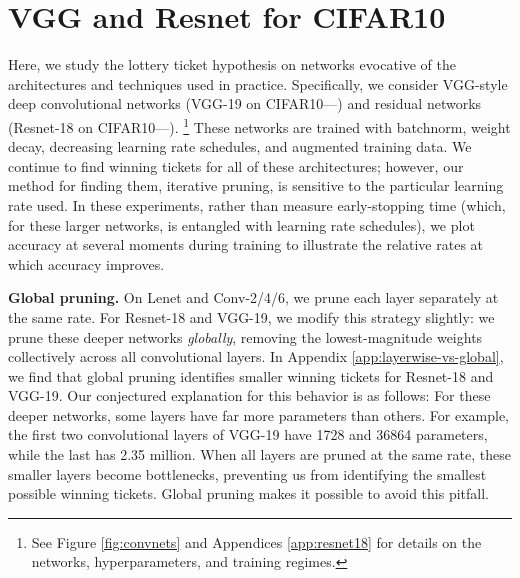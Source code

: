 \section{VGG and Resnet for CIFAR10}
\label{sec:larger}

Here, we study the lottery ticket hypothesis on networks evocative of the architectures and techniques used in practice.
Specifically, we consider VGG-style deep convolutional networks (VGG-19 on CIFAR10---\citet{vgg}) and residual
networks (Resnet-18 on CIFAR10---\citet{resnet}).%
\footnote{See Figure \ref{fig:convnets} and Appendices \ref{app:resnet18} for details on the networks, hyperparameters, and training regimes.}
These networks are trained with batchnorm, weight decay,
decreasing learning rate schedules, and augmented training data.
We continue to find winning tickets for all of these architectures; however, our method for finding them, iterative pruning,
is sensitive to the particular learning rate used. In these experiments, rather than measure early-stopping time (which, for these
larger networks, is entangled with learning rate schedules), we plot accuracy at several moments during training to illustrate
the relative rates at which accuracy improves.

\textbf{Global pruning.}
On Lenet and Conv-2/4/6, we prune each layer separately at the same rate.
For Resnet-18 and VGG-19, we modify this strategy slightly:
we prune these deeper networks \emph{globally}, removing the lowest-magnitude weights collectively across all convolutional layers. 
In Appendix \ref{app:layerwise-vs-global}, we find that global pruning identifies smaller winning tickets for Resnet-18 and VGG-19. Our conjectured explanation for this behavior is as follows:
For these deeper networks, some layers have far more parameters than others.
For example, the first two convolutional layers of VGG-19 have 1728 and 36864 parameters, while the last has 2.35 million. When all layers are pruned at the same rate, these smaller layers become bottlenecks, preventing us from identifying the smallest possible winning tickets. Global pruning makes it possible to avoid this pitfall.

